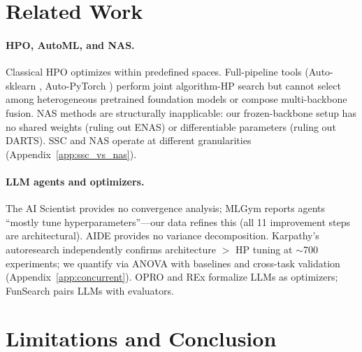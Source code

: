 \documentclass{article}
\begin{document}
\section{Related Work}
\label{sec:related}

\paragraph{HPO, AutoML, and NAS.}
Classical HPO \citep{bergstra2011algorithms, falkner2018bohb, hutter2011smac, snoek2012practical} optimizes within predefined spaces. Full-pipeline tools (Auto-sklearn \citep{feurer2015autosklearn}, Auto-PyTorch \citep{zimmer2021autopytorch}) perform joint algorithm-HP search but cannot select among heterogeneous pretrained foundation models or compose multi-backbone fusion.
NAS methods \citep{liu2019darts, pham2018enas} are structurally inapplicable: our frozen-backbone setup has no shared weights (ruling out ENAS) or differentiable parameters (ruling out DARTS). SSC and NAS operate at different granularities (Appendix~\ref{app:ssc_vs_nas}).

\paragraph{LLM agents and optimizers.}
The AI Scientist \citep{lu2024aiscientist} provides no convergence analysis; MLGym \citep{nathani2025mlgym} reports agents ``mostly tune hyperparameters''---our data refines this (all 11 improvement steps are architectural).
AIDE \citep{jiang2025aide} provides no variance decomposition.
Karpathy's autoresearch \citep{karpathy2026autoresearch} independently confirms architecture $>$ HP tuning at $\sim$700 experiments; we quantify via ANOVA with baselines and cross-task validation (Appendix~\ref{app:concurrent}).
OPRO \citep{yang2024opro} and REx \citep{tang2024rex} formalize LLMs as optimizers; FunSearch \citep{romeraparedes2024funsearch} pairs LLMs with evaluators.


\section{Limitations and Conclusion}
\label{sec:conclusion}
\end{document}
